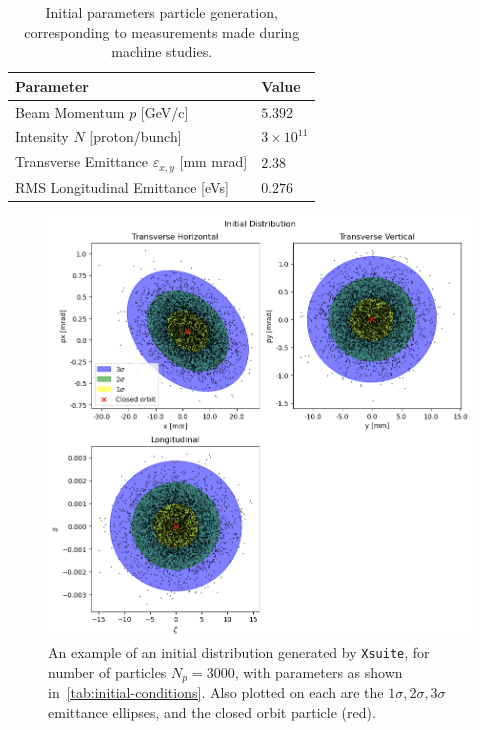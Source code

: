 \documentclass[11pt]{report}
\begin{document}
\begin{table}[]
  \centering
  \begin{tabular}{ll}
    \centering
  Parameter                                       & Value \\ \hline \hline
  Beam Momentum $p$ [GeV/c]                       & $5.392$ \\
  Intensity $N$ [proton/bunch]                    & $3\times10^{11}$ \\
  Transverse Emittance $\varepsilon_{x,y}$ [mm mrad]  & $2.38$ \\
  RMS Longitudinal Emittance [eVs]                & $0.276$
  \end{tabular}
  \caption{Initial parameters particle generation, corresponding to measurements made during machine studies.}\label{tab:initial-conditions}
\end{table}

\begin{figure}
  \centering
  \includegraphics*[width=\linewidth]{initial-dist.png}
  \cprotect\caption{An example of an initial distribution generated by \verb|Xsuite|, for number of particles $N_p=3000$, with parameters as shown in~\autoref{tab:initial-conditions}. Also plotted on each are the $1\sigma, 2\sigma, 3\sigma$ emittance ellipses, and the closed orbit particle (red).}\label{fig:initial-dist}
\end{figure}
\end{document}
